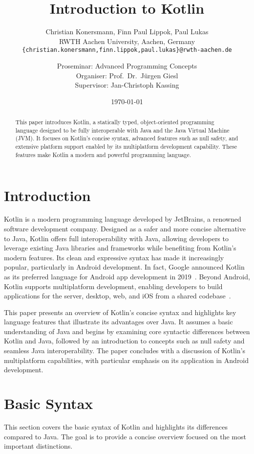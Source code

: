 \documentclass[a4paper,11pt]{article}
\title{\huge \bfseries Introduction to Kotlin}
\author{
  Christian Konersmann, Finn Paul Lippok, Paul Lukas\\[1ex]
  RWTH Aachen University, Aachen, Germany\\
  \texttt{\{christian.konersmann,finn.lippok,paul.lukas\}@rwth-aachen.de}\\
  \and
  Proseminar: Advanced Programming Concepts\\
  Organiser: Prof.\ Dr.\ Jürgen Giesl\\
  Supervisor: Jan-Christoph Kassing
}
\date{\today}
\begin{document}
\maketitle

\begin{abstract}
This paper introduces Kotlin, a statically typed, object-oriented programming language designed to be fully interoperable with Java and the Java Virtual Machine (JVM). It focuses on Kotlin's concise syntax, advanced features such as null safety, and extensive platform support enabled by its multiplatform development capability. These features make Kotlin a modern and powerful programming language.
\end{abstract}

\section{Introduction}
Kotlin is a modern programming language developed by JetBrains, a renowned software development company. Designed as a safer and more concise alternative to Java, Kotlin offers full interoperability with Java, allowing developers to leverage existing Java libraries and frameworks while benefiting from Kotlin's modern features. Its clean and expressive syntax has made it increasingly popular, particularly in Android development. In fact, Google announced Kotlin as its preferred language for Android app development in 2019~\cite{intro-google}. Beyond Android, Kotlin supports multiplatform development, enabling developers to build applications for the server, desktop, web, and iOS from a shared codebase~\cite{intro-multiplatform-dev}.

This paper presents an overview of Kotlin’s concise syntax and highlights key language features that illustrate its advantages over Java. It assumes a basic understanding of Java and begins by examining core syntactic differences between Kotlin and Java, followed by an introduction to concepts such as null safety and seamless Java interoperability. The paper concludes with a discussion of Kotlin’s multiplatform capabilities, with particular emphasis on its application in Android development.

\section{Basic Syntax}
This section covers the basic syntax of Kotlin and highlights its differences compared to Java. The goal is to provide a concise overview focused on the most important distinctions.
\end{document}
